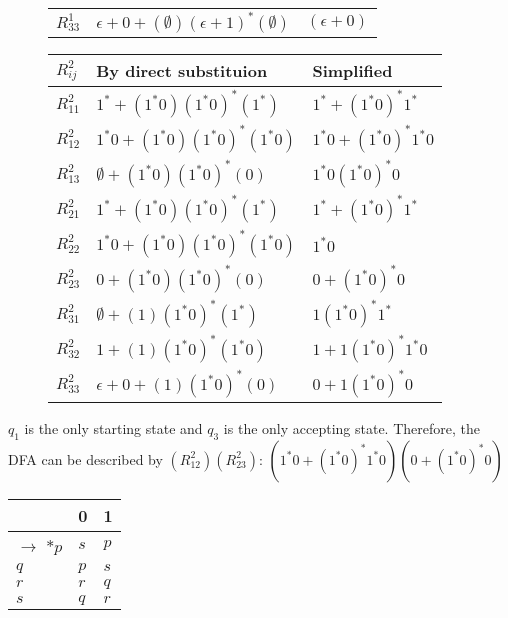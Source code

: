 \documentclass[12pt]{article}
\begin{document}
\begin{figure}[ht]
\begin{tabular}{l||l|l}
        \hline
        $R_{33}^{1}$ & $\epsilon + 0 + (\emptyset)(\epsilon + 1)^*(\emptyset)$       & $(\epsilon + 0)$ \\
    \end{tabular}
    \begin{tabular}{l||l|l}
        $R_{ij}^{2}$ & By direct substituion           & Simplified            \\
        \hline
        $R_{11}^{2}$ & $1^* + (1^*0)(1^*0)^*(1^*)$     & $1^* + (1^*0)^*1^*$   \\
        \hline
        $R_{12}^{2}$ & $1^*0 + (1^*0)(1^*0)^*(1^*0)$   & $1^*0 + (1^*0)^*1^*0$ \\
        \hline
        $R_{13}^{2}$ & $\emptyset + (1^*0)(1^*0)^*(0)$ & $1^*0(1^*0)^*0$       \\
        \hline
        $R_{21}^{2}$ & $1^* + (1^*0)(1^*0)^*(1^*)$     & $1^* + (1^*0)^*1^*$   \\
        \hline
        $R_{22}^{2}$ & $1^*0 + (1^*0)(1^*0)^*(1^*0)$   & $1^*0$                \\
        \hline
        $R_{23}^{2}$ & $0 + (1^*0)(1^*0)^*(0)$         & $0 + (1^*0)^*0$       \\
        \hline
        $R_{31}^{2}$ & $\emptyset + (1)(1^*0)^*(1^*)$  & $1(1^*0)^*1^*$        \\
        \hline
        $R_{32}^{2}$ & $1 + (1)(1^*0)^*(1^*0)$         & $1 + 1(1^*0)^*1^*0$   \\
        \hline
        $R_{33}^{2}$ & $\epsilon + 0 + (1)(1^*0)^*(0)$ & $0 + 1(1^*0)^*0$      \\
    \end{tabular}
    \label{tab:re_3}
\end{figure}

$q_1$ is the only starting state and $q_3$ is the only accepting state.
Therefore, the DFA can be described by $(R_{12}^{2})(R_{23}^{2})$:
$(1^*0 + (1^*0)^*1^*0)(0 + (1^*0)^*0)$

\begin{table}[ht]
    \centering
    \begin{tabular}{ p{1cm}||p{0.5cm}|p{0.5cm} } & 0   & 1   \\
               \hline
               $\rightarrow$ $*p$            & $s$ & $p$ \\
               \hline
               $q$                           & $p$ & $s$ \\
               \hline
               $r$                           & $r$ & $q$ \\
               \hline
               $s$                           & $q$ & $r$ \\
               \hline
    \end{tabular}
\end{table}
\end{document}
